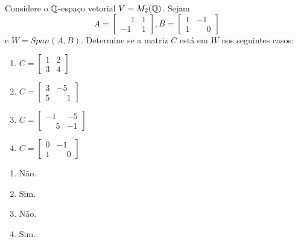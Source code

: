\documentclass[12pt]{exam}
\begin{document}
\begin{exercicio}
    Considere o $\mathbb{Q}$-espaço vetorial $V = M_2(\mathbb{Q})$. Sejam
    \[
        A = \begin{bmatrix}
            \phantom{-} 1 & 1\\
            -1 & 1
        \end{bmatrix},
        B = \begin{bmatrix}
            1 & -1\\
            1 & \phantom{-} 0
        \end{bmatrix}
    \]
    e $W = Span(A, B)$. Determine se a matriz $C$ está em $W$ nos seguintes casos:
    \begin{multicols}{2}
      \begin{enumerate}[label={\alph*})]
          \item $C = \begin{bmatrix}1 & 2\\3 & 4\end{bmatrix}$

          \item $C = \begin{bmatrix}3 & -5\\5 & \phantom{-} 1\end{bmatrix}$

          \item $C = \begin{bmatrix}-1 & -5\\ \phantom{-} 5 & -1\end{bmatrix}$

          \item $C = \begin{bmatrix}0 & -1\\1 & \phantom{-} 0\end{bmatrix}$
      \end{enumerate}
    \end{multicols}
    \begin{solucao}
      \begin{multicols}{2}
        \begin{enumerate}[label={\alph*})]
          \item Não.

          \item Sim.

          \item Não.

          \item Sim.
        \end{enumerate}
      \end{multicols}
    \end{solucao}
\end{exercicio}
\end{document}
